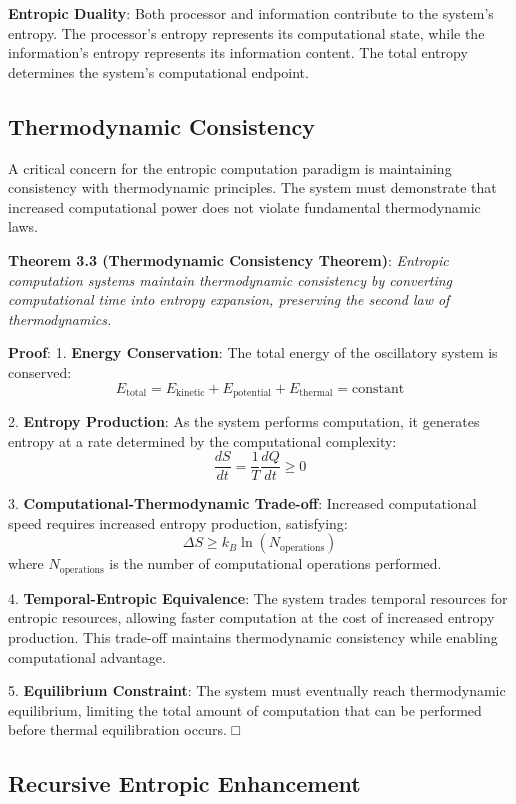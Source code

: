 \documentclass[12pt,a4paper]{article}
\theoremstyle{definition}
\begin{document}
\textbf{Entropic Duality}: Both processor and information contribute to the system's entropy. The processor's entropy represents its computational state, while the information's entropy represents its information content. The total entropy determines the system's computational endpoint.

\subsection{Thermodynamic Consistency}

A critical concern for the entropic computation paradigm is maintaining consistency with thermodynamic principles. The system must demonstrate that increased computational power does not violate fundamental thermodynamic laws.

\textbf{Theorem 3.3 (Thermodynamic Consistency Theorem)}: \textit{Entropic computation systems maintain thermodynamic consistency by converting computational time into entropy expansion, preserving the second law of thermodynamics.}

\textbf{Proof}:
1. \textbf{Energy Conservation}: The total energy of the oscillatory system is conserved:
   $$E_{\text{total}} = E_{\text{kinetic}} + E_{\text{potential}} + E_{\text{thermal}} = \text{constant}$$

2. \textbf{Entropy Production}: As the system performs computation, it generates entropy at a rate determined by the computational complexity:
   $$\frac{dS}{dt} = \frac{1}{T}\frac{dQ}{dt} \geq 0$$

3. \textbf{Computational-Thermodynamic Trade-off}: Increased computational speed requires increased entropy production, satisfying:
   $$\Delta S \geq k_B \ln(N_{\text{operations}})$$
   where $N_{\text{operations}}$ is the number of computational operations performed.

4. \textbf{Temporal-Entropic Equivalence}: The system trades temporal resources for entropic resources, allowing faster computation at the cost of increased entropy production. This trade-off maintains thermodynamic consistency while enabling computational advantage.

5. \textbf{Equilibrium Constraint}: The system must eventually reach thermodynamic equilibrium, limiting the total amount of computation that can be performed before thermal equilibration occurs. □

\subsection{Recursive Entropic Enhancement}
\end{document}
